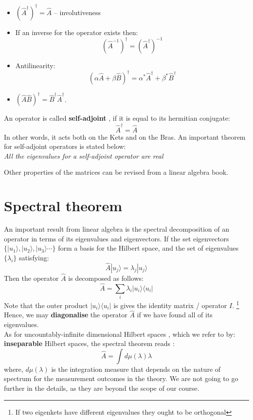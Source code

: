 \begin{enumerate}
 	\begin{itemize}
 		\item $\left( \hat{A}^\dagger\right) ^\dagger = \hat{A}$ – involutiveness\\
 		\item If an inverse for the operator exists then:
 		\[
 		\left( \hat{A}^{-1}\right) ^\dagger = \left( \hat{A}^{\dagger}\right) ^{-1} 
 		\]
 		\item Antilinearity:
 		\[
 		\left( \alpha \hat{A}+ \beta \hat{B}\right) ^\dagger = \alpha^* \hat{A}^\dagger + \beta^* \hat{B}^\dagger 
 		\]
 		\item $ (\hat{A}\hat{B})^\dagger = \hat{B}^\dagger \hat{A}^\dagger $.
 	\end{itemize}
 	An operator is called \textbf{self-adjoint }, if it is equal to its hermitian conjugate:
 	\[
 	\hat{A}^\dagger = \hat{A}
 	\]
 	In other words, it acts both on the Kets and on the Bras.
 	An important theorem for self-adjoint operators is stated below:\\
 	\textit{ All the  eigenvalues for a self-adjoint operator are real }
 \end{enumerate}
 Other properties of the matrices can be revised from a linear algebra book.
 \section{Spectral theorem}
 An important result from linear algebra is the spectral decomposition of an operator in terms of its eigenvalues and eigenvectors. If the set eigenvectors $\{ |u_1\rangle,|u_2\rangle, |u_3\rangle \cdots \}$ form a basis for the Hilbert space, and the set of eigenvalues $\{ \lambda_i\}$ satisfying:
 \begin{equation}
 \hat{A} | u_j \rangle = \lambda_j | u_j\rangle
 \end{equation}
 Then the operator $ \hat{A}$ is decomposed as follows:
 \begin{equation}
 \hat{A} = \sum_i  \lambda_i | u_i \rangle\langle u_i | 
 \end{equation}
 Note that the outer product $| u_i \rangle\langle u_i | $ is gives the identity matrix / operator $I$. \footnote{If two eigenkets have different eigenvalues they ought to be orthogonal} Hence, we may \textbf{diagonalise} the operator $ \hat{A}$ if we have found all of its eigenvalues. \\
 As for uncountably-infinite dimensional Hilbert spaces , which we refer to by: \textbf{inseparable} Hilbert spaces, the spectral theorem reads :
 \begin{equation}
 \hat{A} = \int d\mu(\lambda) \lambda 
 \end{equation}
 where, $ d\mu(\lambda)$ is the integration measure that depends on the nature of spectrum for the measurement outcomes in the theory. We are not going to go further in the details, as they are beyond the scope of our course. 
